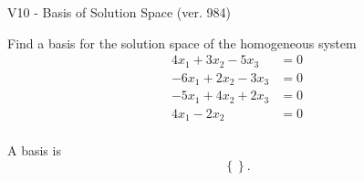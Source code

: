 \begin{exercise}
  \begin{exerciseTitle}V10 - Basis of Solution Space (ver. 984)\end{exerciseTitle}
  \begin{exerciseStatement}
    Find a basis for the solution space of the homogeneous system 
\begin{align*}
 4 x_ 1 + 3 x_ 2 -5 x_ 3 &= 0  \\ 
  -6 x_ 1 + 2 x_ 2 -3 x_ 3 &= 0  \\ 
  -5 x_ 1 + 4 x_ 2 + 2 x_ 3 &= 0  \\ 
  4 x_ 1 -2 x_ 2 &= 0  \\ 
 \end{align*}


 
  \end{exerciseStatement}

  \begin{exerciseAnswer}
   A basis is   
\[\left\{\right\}.\]

  


  \end{exerciseAnswer}
\end{exercise}